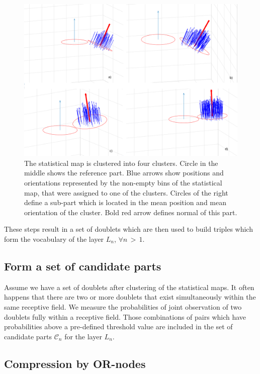 \documentclass[conference]{IEEEtran}
\begin{document}
{\begin{figure}
\centering
\includegraphics[scale=0.3]{Clustering}
\caption{The statistical map is clustered into four clusters. Circle
in the middle shows the reference part. Blue arrows show positions
and orientations represented by the non-empty bins of the
statistical map, that were assigned to one of the clusters. Circles
of the right define a sub-part which is located in the mean position
and mean orientation of the cluster. Bold red arrow defines normal
of this part.} \label{fig:clustering}
\end{figure}

These steps result in a set of doublets which are then used to build
triples which form the vocabulary of the layer $L_n$, $\forall
n\,{>}\,1$.

\subsection{Form a set of candidate parts \label{sec:Candidates}}

Assume we have a set of doublets after clustering of the statistical
maps. It often happens that there are two or more doublets that
exist simultaneously within the same receptive field. We measure the
probabilities of joint observation of two doublets fully within a
receptive field. Those combinations of pairs which have
probabilities above a pre-defined threshold value are included in
the set of candidate parts $\mathcal{C}_n$ for the layer $L_n$.

\subsection{Compression by OR-nodes \label{sec:OR-nodes}}

}
\end{document}
